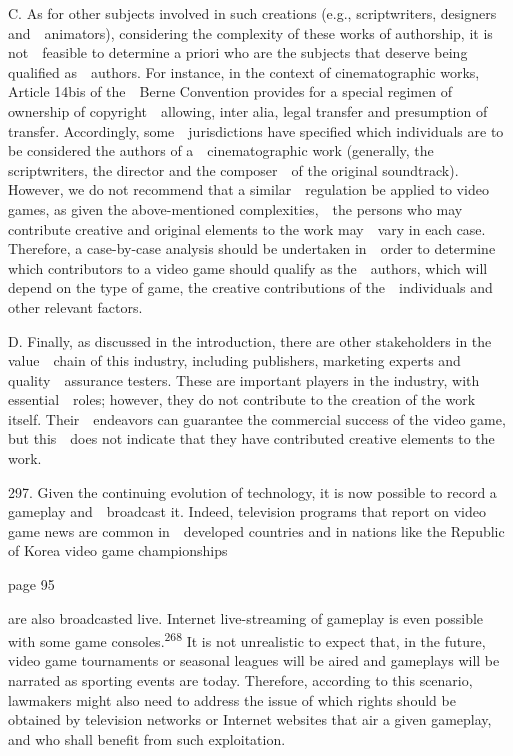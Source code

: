 \documentclass[
]{article}
\begin{document}
{C. As for other subjects involved in such creations (e.g.,
scriptwriters, designers and~~animators), considering the complexity of
these works of authorship, it is not~~feasible to determine }{a priori
}{who are the subjects that deserve being qualified as~~authors. For
instance, in the context of cinematographic works, Article 14bis of
the~~Berne Convention provides for a special regimen of ownership of
copyright~~allowing, inter alia, legal transfer and presumption of
transfer. Accordingly, some~~jurisdictions have specified which
individuals are to be considered the authors of a~~cinematographic work
(generally, the scriptwriters, the director and the composer~~of the
original soundtrack). However, we do not recommend that a
similar~~regulation be applied to video games, as given the
above-mentioned complexities,~~the persons who may contribute creative
and original elements to the work may~~vary in each case. Therefore, a
case-by-case analysis should be undertaken in~~order to determine which
contributors to a video game should qualify as the~~authors, which will
depend on the type of game, the creative contributions of
the~~individuals and other relevant factors.}

{D. Finally, as discussed in the introduction, there are other
stakeholders in the value~~chain of this industry, including publishers,
marketing experts and quality~~assurance testers. These are important
players in the industry, with essential~~roles; however, they do not
contribute to the creation of the work itself. Their~~endeavors can
guarantee the commercial success of the video game, but this~~does not
indicate that they have contributed creative elements to the work.}

{297. }{Given the continuing evolution of technology, it is now possible
to record a gameplay and~~broadcast it. Indeed, television programs that
report on video game news are common in~~developed countries and in
nations like the Republic of Korea video game championships}

{page 95}

{are also broadcasted live. Internet live-streaming of gameplay is even
possible with some game consoles.}\textsuperscript{{268 }}{It is not
unrealistic to expect that, in the future, video game tournaments or
seasonal leagues will be aired and gameplays will be narrated as
sporting events are today. Therefore, according to this scenario,
lawmakers might also need to address the issue of which rights should be
obtained by television networks or Internet websites that air a given
gameplay, and who shall benefit from such exploitation.}
\end{document}
